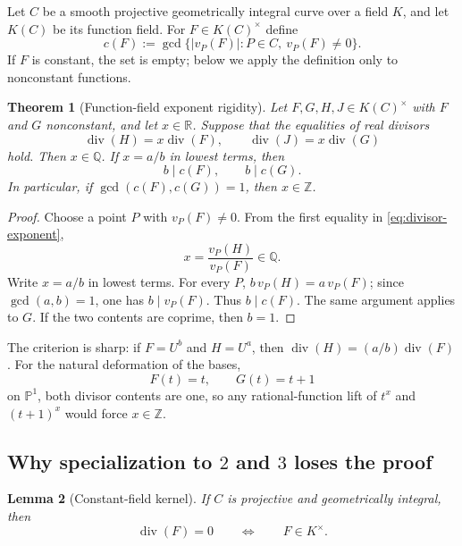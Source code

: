 \documentclass[11pt]{article}
\newtheorem{theorem}{Theorem}[section]
\newtheorem{lemma}[theorem]{Lemma}
\theoremstyle{definition}
\theoremstyle{remark}
\newcommand{\Z}{\mathbb Z}
\newcommand{\Q}{\mathbb Q}
\newcommand{\R}{\mathbb R}
\begin{document}
Let $C$ be a smooth projective geometrically integral curve over a field $K$,
and let $K(C)$ be its function field.  For $F\in K(C)^{\times}$ define
\begin{equation}\label{eq:divisor-content}
 c(F):=\gcd\{|v_P(F)|:P\in C,\ v_P(F)\neq0\}.
\end{equation}
If $F$ is constant, the set is empty; below we apply the definition only to
nonconstant functions.

\begin{theorem}[Function-field exponent rigidity]\label{thm:function-field}
Let $F,G,H,J\in K(C)^{\times}$ with $F$ and $G$ nonconstant, and let
$x\in\R$.  Suppose that the equalities of real divisors
\begin{equation}\label{eq:divisor-exponent}
 \operatorname{div}(H)=x\operatorname{div}(F),
 \qquad
 \operatorname{div}(J)=x\operatorname{div}(G)
\end{equation}
hold.  Then $x\in\Q$.  If $x=a/b$ in lowest terms, then
\[
 b\mid c(F),\qquad b\mid c(G).
\]
In particular, if $\gcd(c(F),c(G))=1$, then $x\in\Z$.
\end{theorem}

\begin{proof}
Choose a point $P$ with $v_P(F)\neq0$.  From the first equality in
\eqref{eq:divisor-exponent},
\[
 x=\frac{v_P(H)}{v_P(F)}\in\Q.
\]
Write $x=a/b$ in lowest terms.  For every $P$,
$b\,v_P(H)=a\,v_P(F)$; since $\gcd(a,b)=1$, one has
$b\mid v_P(F)$.  Thus $b\mid c(F)$.  The same argument applies to $G$.
If the two contents are coprime, then $b=1$.
\end{proof}

The criterion is sharp: if $F=U^b$ and $H=U^a$, then
$\operatorname{div}(H)=(a/b)\operatorname{div}(F)$.  For the natural
deformation of the bases,
\[
 F(t)=t,\qquad G(t)=t+1
\]
on $\mathbb P^1$, both divisor contents are one, so any rational-function
lift of $t^x$ and $(t+1)^x$ would force $x\in\Z$.

\subsection{Why specialization to $2$ and $3$ loses the proof}

\begin{lemma}[Constant-field kernel]\label{lem:constant-kernel}
If $C$ is projective and geometrically integral, then
\[
 \operatorname{div}(F)=0\qquad\Longleftrightarrow\qquad F\in K^{\times}.
\]
\end{lemma}
\end{document}
